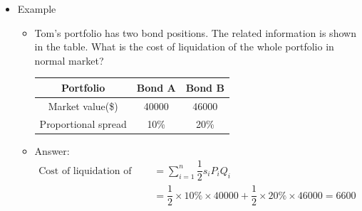 \begin{itemize}
\begin{itemize}
\begin{align*}
            = \sum_{i=1}^{n} \frac{1}{2} s_i\, P_i\, Q_i = \sum_{i=1}^{n} \frac{1}{2} (\text{offer price}_i - \text{bid price}_i)\, Q_i
            \end{align*}
            \begin{center}
                $s_i$ : proportional spread \\
                $P_i$ : mid price \\
                $Q_i$ : liquidation volume
                \end{center}
    \end{itemize}
\item Example
    \begin{itemize}
    \item Tom's portfolio has two bond positions. The related information is shown in the table. What is the cost of liquidation of the whole portfolio in normal market?
        \begin{table}[htbp]
        \centering
        \begin{tabular}{|c|c|c|}
        \hline
        Portfolio & Bond A & Bond B \\
        \hline
        Market value(\$) & 40000 & 46000 \\
        \hline
        Proportional spread & 10\% & 20\% \\
        \hline
        \end{tabular}
        \end{table}
    \item Answer:
    \begin{align*}
        \text{Cost of liquidation of the whole portfolio} 
        &= \sum_{i=1}^{n} \dfrac{1}{2} s_i P_i Q_i \\
        &= \dfrac{1}{2} \times 10\% \times 40000 + \dfrac{1}{2} \times 20\% \times 46000 = 6600
        \end{align*}
 
    \end{itemize}


\end{itemize}
